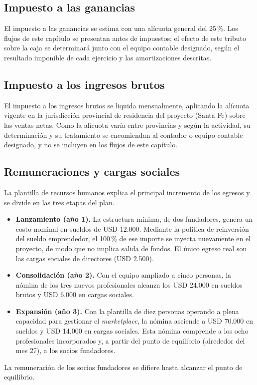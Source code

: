 \subsection{Impuesto a las ganancias}
El impuesto a las ganancias se estima con una alícuota general del 25\,\%. Los flujos de este capítulo se presentan antes de impuestos; el efecto de este tributo sobre la caja se determinará junto con el equipo contable designado, según el resultado imponible de cada ejercicio y las amortizaciones descritas.

\subsection{Impuesto a los ingresos brutos}
El impuesto a los ingresos brutos se liquida mensualmente, aplicando la alícuota vigente en la jurisdicción provincial de residencia del proyecto (Santa Fe) sobre las ventas netas. Como la alícuota varía entre provincias y según la actividad, su determinación y su tratamiento se encomiendan al contador o equipo contable designado, y no se incluyen en los flujos de este capítulo.

\subsection{Remuneraciones y cargas sociales}
La plantilla de recursos humanos explica el principal incremento de los egresos y se divide en las tres etapas del plan.
\begin{itemize}
  \item \textbf{Lanzamiento (año 1).} La estructura mínima, de dos fundadores, genera un costo nominal en sueldos de USD 12.000. Mediante la política de reinversión del sueldo emprendedor, el 100\,\% de ese importe se inyecta nuevamente en el proyecto, de modo que no implica salida de fondos. El único egreso real son las cargas sociales de directores (USD 2.500).
  \item \textbf{Consolidación (año 2).} Con el equipo ampliado a cinco personas, la nómina de los tres nuevos profesionales alcanza los USD 24.000 en sueldos brutos y USD 6.000 en cargas sociales.
  \item \textbf{Expansión (año 3).} Con la plantilla de diez personas operando a plena capacidad para gestionar el \textit{marketplace}, la nómina asciende a USD 70.000 en sueldos y USD 14.000 en cargas sociales. Esta nómina comprende a los ocho profesionales incorporados y, a partir del punto de equilibrio (alrededor del mes 27), a los socios fundadores.
\end{itemize}
La remuneración de los socios fundadores se difiere hasta alcanzar el punto de equilibrio.

